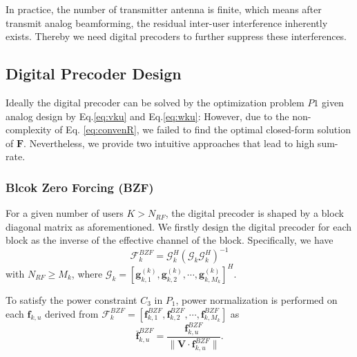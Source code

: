 \documentclass[conference]{IEEEtran}
\begin{document}
{In practice, the number of transmitter antenna is finite, which means after transmit analog beamforming, the residual inter-user interference inherently exists. Thereby we need digital precoders to further suppress these interferences.

\subsection{Digital Precoder Design}\label{digital}
Ideally the digital precoder can be solved by the optimization problem $P1$ given analog design by Eq.\eqref{eq:vku} and Eq.\eqref{eq:wku}:
However, due to the non-complexity of Eq. \eqref{eq:convenR}, we failed to find the optimal closed-form solution of $\bm F$. Nevertheless, we provide two intuitive approaches that lead to high sum-rate.

\subsubsection{Blcok Zero Forcing (BZF)}
For a given number of users $K>N_{RF}$, the digital precoder is shaped by a block diagonal matrix as aforementioned. We firstly design the digital precoder for each block as the inverse of the effective channel of the block. Specifically, we have
\begin{equation}
\bm{\mathcal{F}}^{BZF}_{k} = \bm{\mathcal{G}}_k^H (\bm{\mathcal{G}}_k \bm{\mathcal{G}}_k^H)^{-1}
\end{equation}
with $N_{RF}\geq M_k$, where $\bm{\mathcal{G}}_k = [\bm{g}^{(k)}_{k,1}, \bm{g}^{(k)}_{k,2},\cdots,\bm{g}^{(k)}_{k,M_k}]^H$.

To satisfy the power constraint $C_3$ in $P_1$, power normalization is performed on each ${\bm f}_{k,u}$ derived from $\bm{\mathcal{F}}^{BZF}_{k}=\left[\bm{f}^{BZF}_{k,1},\bm{f}^{BZF}_{k,2},\cdots,\bm{f}^{BZF}_{k,M_k}\right]$ as
\begin{equation}\label{eq:ZFU-HBF2}
\bm{\bar{f}}^{BZF}_{k,u} = \frac{\bm{f}^{BZF}_{k,u}}{\|\bm{V}\cdot\bm{f}^{BZF}_{k,u}\|}.
\end{equation}

}
\end{document}

